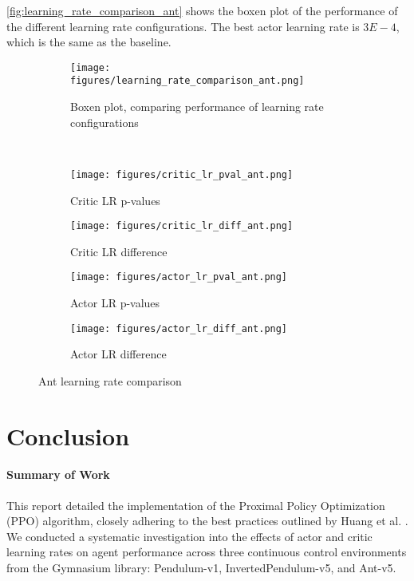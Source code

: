 \documentclass{article}
\begin{document}
\autoref{fig:learning_rate_comparison_ant} shows the boxen plot of the performance of the different learning rate configurations. The best actor learning rate is \(3E-4\), which is the same as the baseline.

\begin{figure}[h!]
    \centering
    \begin{subfigure}{0.4\textwidth}
        \centering
        \texttt{[image: figures/learning\_rate\_comparison\_ant.png]}
        \captionsetup{justification=centering}
        \caption{Boxen plot, comparing performance of learning rate configurations}
        \label{fig:learning_rate_comparison_ant}
    \end{subfigure}
    \\
    \begin{subfigure}{0.24\textwidth}
        \centering
        \texttt{[image: figures/critic\_lr\_pval\_ant.png]}
        \captionsetup{justification=centering}
        \caption{Critic LR p-values}
        \label{fig:critic_lr_pval_ant}
    \end{subfigure}
    \begin{subfigure}{0.24\textwidth}
        \centering
        \texttt{[image: figures/critic\_lr\_diff\_ant.png]}
        \captionsetup{justification=centering}
        \caption{Critic LR difference}
        \label{fig:critic_lr_diff_ant}
    \end{subfigure}
    \begin{subfigure}{0.24\textwidth}
        \centering
        \texttt{[image: figures/actor\_lr\_pval\_ant.png]}
        \captionsetup{justification=centering}
        \caption{Actor LR p-values}
        \label{fig:actor_lr_pval_ant}
    \end{subfigure}
    \begin{subfigure}{0.24\textwidth}
        \centering
        \texttt{[image: figures/actor\_lr\_diff\_ant.png]}
        \captionsetup{justification=centering}
        \caption{Actor LR difference}
        \label{fig:actor_lr_diff_ant}
    \end{subfigure}
    \caption{Ant learning rate comparison}
    \label{fig:ant_analysis}
\end{figure}

\section{Conclusion}

\paragraph{Summary of Work}
This report detailed the implementation of the Proximal Policy Optimization (PPO) algorithm, closely adhering to the best practices outlined by Huang et al. \cite{shengyi2022the37implementation}. We conducted a systematic investigation into the effects of actor and critic learning rates on agent performance across three continuous control environments from the Gymnasium library: Pendulum-v1, InvertedPendulum-v5, and Ant-v5.
\end{document}
